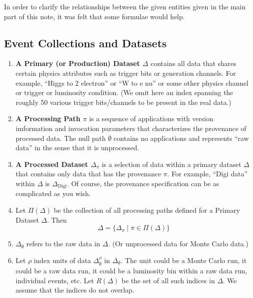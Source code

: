 \documentclass[pdftex]{cmspaper}
\begin{document}
{In order to clarify the relationships between the given entities given
in the main part of this note, it was felt that some formulae would help.

\subsection{Event Collections and Datasets}

\begin{enumerate}

\item {\bf A Primary (or Production) Dataset $\Delta$} 
      contains all data that shares certain physics attributes such as
      trigger bits or generation channels.  For example, ``Higgs to
      2 electron'' or ``W to e nu'' or some other physics channel or
      trigger or luminosity condition.  (We omit here an index spanning
      the roughly 50 various trigger bits/channels to be present in the
      real data.)

\item {\bf A Processing Path $\pi$} is a sequence of applications
      with version imformation and invocation parameters that characterizes
      the provenance of processed data.  The null path $\emptyset$ contains
      no applications and represents ``raw data'' in the sense that it is
      unprocessed.

\item {\bf A Processed Dataset $\Delta_{\pi}$} is a selection of data within 
      a primary dataset $\Delta$ that contains only data that has the 
      provenance $\pi$.  For example, ``Digi data'' within $\Delta$ is 
      $\Delta_{\mbox{Digi}}$.  Of course, the provenance specification can 
      be as complicated as you wish.

\item Let $\Pi(\Delta)$ be the collection of all processing paths defined for a Primary 
Dataset $\Delta $.  Then 
\begin{equation}
    \Delta = \{ \Delta_{\pi} \mid \pi \in \Pi(\Delta) \}
\end{equation}

\item $\Delta_{\emptyset}$ refers to the raw data in $\Delta$. (Or unprocessed data for 
Monte Carlo data.) 

\item Let $\rho$ index units of data $\Delta_{\emptyset}^{\rho}$ 
      in $\Delta_{\emptyset}$.  The unit could be a Monte Carlo run,
      it could be a raw data run, it could be a luminosity bin within
      a raw data run, individual events, etc.  Let $R(\Delta)$ be the
      set of all such indices in $\Delta$.  We assume that the indices
      do not overlap.


\end{enumerate}}
\end{document}
